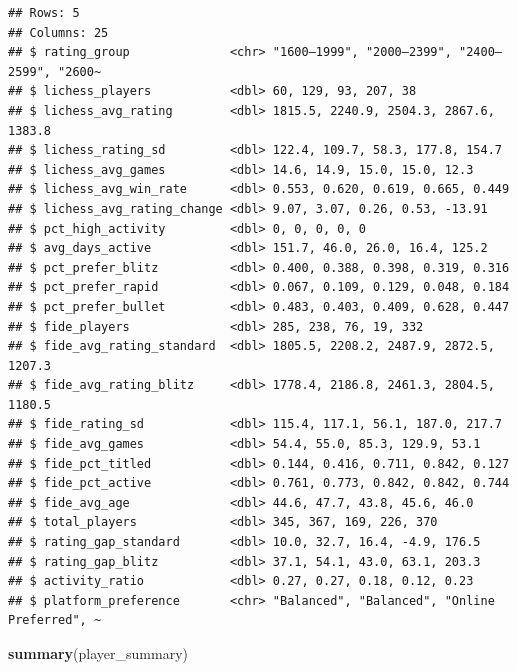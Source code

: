 \documentclass[
]{article}
\newenvironment{Shaded}{\begin{snugshade}}{\end{snugshade}}
\newcommand{\FunctionTok}[1]{\textcolor[rgb]{0.13,0.29,0.53}{\textbf{#1}}}
\newcommand{\NormalTok}[1]{#1}
\begin{document}
\begin{verbatim}
## Rows: 5
## Columns: 25
## $ rating_group              <chr> "1600–1999", "2000–2399", "2400–2599", "2600~
## $ lichess_players           <dbl> 60, 129, 93, 207, 38
## $ lichess_avg_rating        <dbl> 1815.5, 2240.9, 2504.3, 2867.6, 1383.8
## $ lichess_rating_sd         <dbl> 122.4, 109.7, 58.3, 177.8, 154.7
## $ lichess_avg_games         <dbl> 14.6, 14.9, 15.0, 15.0, 12.3
## $ lichess_avg_win_rate      <dbl> 0.553, 0.620, 0.619, 0.665, 0.449
## $ lichess_avg_rating_change <dbl> 9.07, 3.07, 0.26, 0.53, -13.91
## $ pct_high_activity         <dbl> 0, 0, 0, 0, 0
## $ avg_days_active           <dbl> 151.7, 46.0, 26.0, 16.4, 125.2
## $ pct_prefer_blitz          <dbl> 0.400, 0.388, 0.398, 0.319, 0.316
## $ pct_prefer_rapid          <dbl> 0.067, 0.109, 0.129, 0.048, 0.184
## $ pct_prefer_bullet         <dbl> 0.483, 0.403, 0.409, 0.628, 0.447
## $ fide_players              <dbl> 285, 238, 76, 19, 332
## $ fide_avg_rating_standard  <dbl> 1805.5, 2208.2, 2487.9, 2872.5, 1207.3
## $ fide_avg_rating_blitz     <dbl> 1778.4, 2186.8, 2461.3, 2804.5, 1180.5
## $ fide_rating_sd            <dbl> 115.4, 117.1, 56.1, 187.0, 217.7
## $ fide_avg_games            <dbl> 54.4, 55.0, 85.3, 129.9, 53.1
## $ fide_pct_titled           <dbl> 0.144, 0.416, 0.711, 0.842, 0.127
## $ fide_pct_active           <dbl> 0.761, 0.773, 0.842, 0.842, 0.744
## $ fide_avg_age              <dbl> 44.6, 47.7, 43.8, 45.6, 46.0
## $ total_players             <dbl> 345, 367, 169, 226, 370
## $ rating_gap_standard       <dbl> 10.0, 32.7, 16.4, -4.9, 176.5
## $ rating_gap_blitz          <dbl> 37.1, 54.1, 43.0, 63.1, 203.3
## $ activity_ratio            <dbl> 0.27, 0.27, 0.18, 0.12, 0.23
## $ platform_preference       <chr> "Balanced", "Balanced", "Online Preferred", ~
\end{verbatim}

\begin{Shaded}
\begin{Highlighting}[]
\FunctionTok{summary}\NormalTok{(player\_summary)}
\end{Highlighting}
\end{Shaded}
\end{document}
